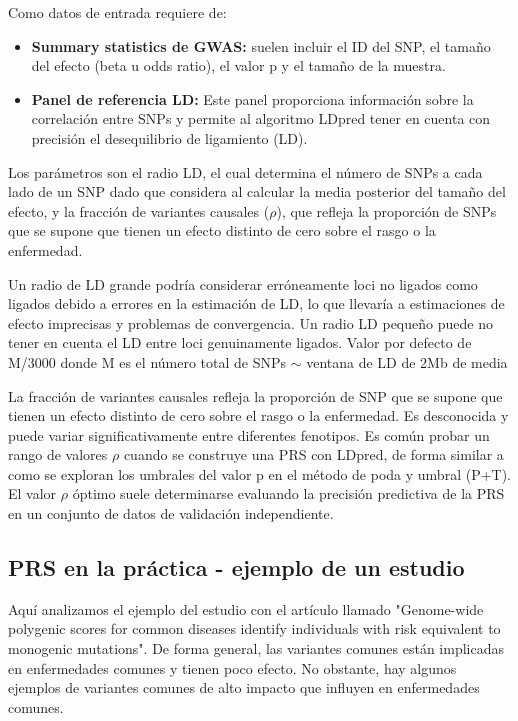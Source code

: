 Como datos de entrada requiere de:
\begin{itemize}
\item \textbf{Summary statistics de GWAS:} suelen incluir el ID del SNP, el tamaño del efecto (beta u odds ratio), el valor p y el tamaño de la muestra.
\item \textbf{Panel de referencia LD:} Este panel proporciona información sobre la correlación entre SNPs y permite al algoritmo LDpred tener en cuenta con precisión el desequilibrio de ligamiento (LD).
\end{itemize}

Los parámetros son el radio LD, el cual determina el número de SNPs a cada lado de un SNP dado que considera al calcular la media posterior del tamaño del efecto, y la fracción de variantes causales ($\rho$), que refleja la proporción de SNPs que se supone que tienen un efecto distinto de cero sobre el rasgo o la enfermedad.

Un radio de LD grande podría considerar erróneamente loci no ligados como ligados debido a errores en la estimación de LD, lo que llevaría a estimaciones de efecto imprecisas y problemas de convergencia. 
Un radio LD pequeño puede no tener en cuenta el LD entre loci genuinamente ligados.
Valor por defecto de M/3000 donde M es el número total de SNPs $\sim$ ventana de LD de 2Mb de media 

La fracción de variantes causales refleja la proporción de SNP que se supone que tienen un efecto distinto de cero sobre el rasgo o la enfermedad. Es desconocida y puede variar significativamente entre diferentes fenotipos. Es común probar un rango de valores $\rho$ cuando se construye una PRS con LDpred, de forma similar a como se exploran los umbrales del valor p en el método de poda y umbral (P+T).
El valor $\rho$ óptimo suele determinarse evaluando la precisión predictiva de la PRS en un conjunto de datos de validación independiente.

\subsection{PRS en la práctica - ejemplo de un estudio}
Aquí analizamos el ejemplo del estudio con el artículo llamado "Genome-wide polygenic scores for common diseases identify individuals with risk equivalent to monogenic mutations". De forma general, las variantes comunes están implicadas en enfermedades comunes y tienen poco efecto. No obstante, hay algunos ejemplos de variantes comunes de alto impacto que influyen en enfermedades comunes.

